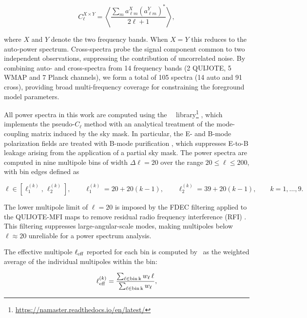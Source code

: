 \begin{equation}
    \label{eq:cl_cross}
    C_{\ell}^{X \times Y} = \left\langle \frac{\sum_{m} a_{\ell m}^{X} (a_{\ell m}^{Y})^{*}}{2\ell + 1} \right\rangle,
\end{equation}

where $X$ and $Y$ denote the two frequency bands. When $X = Y$ this reduces to the auto-power spectrum. Cross-spectra probe the signal component common to two independent observations, suppressing the contribution of uncorrelated noise. By combining auto- and cross-spectra from 14 frequency bands (2 QUIJOTE, 5 WMAP and 7 Planck channels), we form a total of 105 spectra (14 auto and 91 cross), providing broad multi-frequency coverage for constraining the foreground model parameters.

All power spectra in this work are computed using the \namaster\ \python\ library\footnote{\url{https://namaster.readthedocs.io/en/latest/}} \citep{Namaster}, which implements the pseudo-$C_\ell$ method with an analytical treatment of the mode-coupling matrix induced by the sky mask. In particular, the E- and B-mode polarization fields are treated with B-mode purification \citep{Smith_2006}, which suppresses E-to-B leakage arising from the application of a partial sky mask. The power spectra are computed in nine multipole bins of width $\Delta\ell = 20$ over the range $20 \leq \ell \leq 200$, with bin edges defined as

\begin{equation}
\ell \in [\ell_1^{(k)},\, \ell_2^{(k)}], \qquad
\ell_1^{(k)} = 20 + 20(k-1), \qquad
\ell_2^{(k)} = 39 + 20(k-1), \qquad
k = 1,\ldots,9 .
\end{equation}



The lower multipole limit of $\ell = 20$ is imposed by the FDEC filtering applied to the QUIJOTE-MFI maps to remove residual radio frequency interference (RFI) \citep{QUIJOTE_IV}. This filtering suppresses large-angular-scale modes, making multipoles below $\ell \approx 20$ unreliable for a power spectrum analysis. 

The effective multipole $\ell_{\rm eff}$ reported for each bin is computed by \namaster\ as the weighted average of the individual multipoles within the bin:

\begin{equation}
    \ell_{\rm eff}^{(k)} = \frac{\sum_{\ell \in \rm bin\,k} w_\ell\, \ell}{\sum_{\ell \in \rm bin\,k} w_\ell},
\end{equation}

